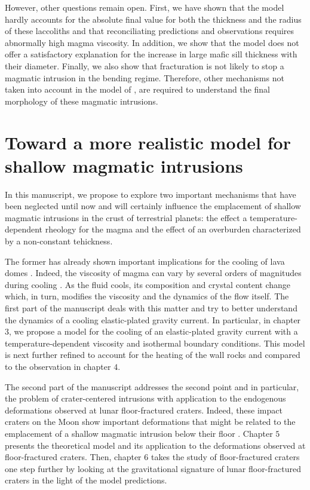 However, other questions  remain open.  First, we have  shown that the
model  hardly accounts  for  the  absolute final  value  for both  the
thickness and the  radius of these laccoliths  and that reconciliating
predictions and observations requires abnormally high magma viscosity.
In addition,  we show  that the  model does  not offer  a satisfactory
explanation for the increase in  large mafic sill thickness with their
diameter. Finally,  we also  show that fracturation  is not  likely to
stop  a magmatic  intrusion in  the bending  regime. Therefore,  other
mechanisms    not   taken    into    account   in    the   model    of
\citet{Michaut:2011kg},   are  required   to   understand  the   final
morphology of these magmatic intrusions.

\section{Toward   a  more   realistic  model   for  shallow   magmatic
  intrusions}
\label{C2-sec:discussion}

In this  manuscript, we  propose to  explore two  important mechanisms
that have  been neglected until  now and will certainly  influence the
emplacement of shallow magmatic intrusions in the crust of terrestrial
planets: the effect a temperature-dependent rheology for the magma and
the effect of an overburden characterized by a non-constant tehickness.

The former has already shown important implications for the cooling of
lava                                                             domes
\citep{Bercovici:2007vc,Bercovici:1996uu,BALMFORTH:1999ey,Garel:2014era}. Indeed,
the viscosity of magma can vary by several orders of magnitudes during
cooling \citep{Anonymous:CZVBrBvv,Lejeune:1995fc}. As the fluid cools,
its composition  and crystal content  change which, in  turn, modifies
the viscosity and the dynamics of  the flow itself.  The first part of
the manuscript deals with this matter and try to better understand the
dynamics of a cooling  elastic-plated gravity current.  In particular,
in  chapter   $3$,  we  propose  a   model  for  the  cooling   of  an
elastic-plated gravity current  with a temperature-dependent viscosity
and  isothermal  boundary  conditions.   This model  is  next  further
refined to account  for the heating of the wall  rocks and compared to
the observation in chapter $4$.

The second  part of the manuscript  addresses the second point  and in
particular, the problem of crater-centered intrusions with application
to  the  endogenous  deformations observed  at  lunar  floor-fractured
craters.   Indeed, these  impact craters  on the  Moon show  important
deformations that  might be  related to the  emplacement of  a shallow
magmatic intrusion below  their floor \citep{Schultz:1976kt}.  Chapter
$5$  presents  the  theoretical  model  and  its  application  to  the
deformations observed  at floor-fractured  craters. Then,  chapter $6$
takes the study of floor-fractured craters one step further by looking
at the gravitational signature of lunar floor-fractured craters in the
light of the model predictions.

